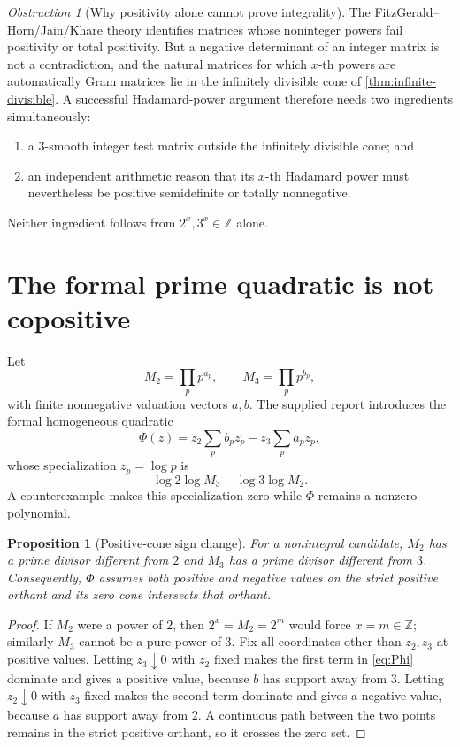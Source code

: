 \documentclass[11pt,oneside]{article}
\newtheorem{proposition}[theorem]{Proposition}
\theoremstyle{definition}
\theoremstyle{remark}
\newtheorem{obstruction}[theorem]{Obstruction}
\newcommand{\Mtwo}{M_2}
\newcommand{\Mthree}{M_3}
\newcommand{\Z}{\mathbb{Z}}
\begin{document}
\begin{obstruction}[Why positivity alone cannot prove integrality]
The FitzGerald--Horn/Jain/Khare theory identifies matrices whose noninteger powers fail positivity or total positivity.  But a negative determinant of an integer matrix is not a contradiction, and the natural matrices for which $x$-th powers are automatically Gram matrices lie in the infinitely divisible cone of \cref{thm:infinite-divisible}.  A successful Hadamard-power argument therefore needs two ingredients simultaneously:
\begin{enumerate}
\item a $3$-smooth integer test matrix outside the infinitely divisible cone; and
\item an independent arithmetic reason that its $x$-th Hadamard power must nevertheless be positive semidefinite or totally nonnegative.
\end{enumerate}
Neither ingredient follows from $2^x,3^x\in\Z$ alone.
\end{obstruction}

\section{The formal prime quadratic is not copositive}
\label{sec:formal-quadratic}

Let
\[
 \Mtwo=\prod_p p^{a_p},
 \qquad
 \Mthree=\prod_p p^{b_p},
\]
with finite nonnegative valuation vectors $a,b$.  The supplied report introduces the formal homogeneous quadratic
\begin{equation}
 \Phi(z)=z_2\sum_p b_pz_p-z_3\sum_pa_pz_p,
 \label{eq:Phi}
\end{equation}
whose specialization $z_p=\log p$ is
\[
 \log2\log \Mthree-\log3\log \Mtwo.
\]
A counterexample makes this specialization zero while $\Phi$ remains a nonzero polynomial.

\begin{proposition}[Positive-cone sign change]
\label{prop:Phi-sign}
For a nonintegral candidate, $\Mtwo$ has a prime divisor different from $2$ and $\Mthree$ has a prime divisor different from $3$.  Consequently, $\Phi$ assumes both positive and negative values on the strict positive orthant and its zero cone intersects that orthant.
\end{proposition}

\begin{proof}
If $\Mtwo$ were a power of $2$, then $2^x=\Mtwo=2^m$ would force $x=m\in\Z$; similarly $\Mthree$ cannot be a pure power of $3$.  Fix all coordinates other than $z_2,z_3$ at positive values.  Letting $z_3\downarrow0$ with $z_2$ fixed makes the first term in \eqref{eq:Phi} dominate and gives a positive value, because $b$ has support away from $3$.  Letting $z_2\downarrow0$ with $z_3$ fixed makes the second term dominate and gives a negative value, because $a$ has support away from $2$.  A continuous path between the two points remains in the strict positive orthant, so it crosses the zero set.
\end{proof}
\end{document}
